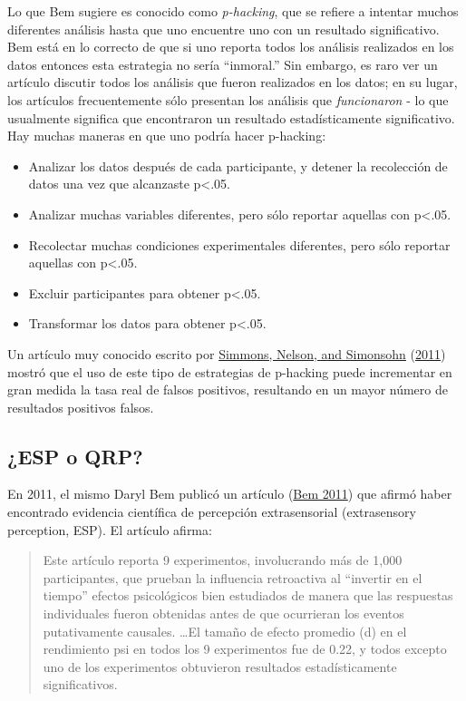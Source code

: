 \documentclass[
  12pt,
]{book}
\providecommand{\tightlist}{%
  \setlength{\itemsep}{0pt}\setlength{\parskip}{0pt}}
\begin{document}
Lo que Bem sugiere es conocido como \emph{p-hacking}, que se refiere a intentar muchos diferentes análisis hasta que uno encuentre uno con un resultado significativo. Bem está en lo correcto de que si uno reporta todos los análisis realizados en los datos entonces esta estrategia no sería ``inmoral.'' Sin embargo, es raro ver un artículo discutir todos los análisis que fueron realizados en los datos; en su lugar, los artículos frecuentemente sólo presentan los análisis que \emph{funcionaron} - lo que usualmente significa que encontraron un resultado estadísticamente significativo. Hay muchas maneras en que uno podría hacer p-hacking:

\begin{itemize}
\tightlist
\item
  Analizar los datos después de cada participante, y detener la recolección de datos una vez que alcanzaste p\textless.05.
\item
  Analizar muchas variables diferentes, pero sólo reportar aquellas con p\textless.05.
\item
  Recolectar muchas condiciones experimentales diferentes, pero sólo reportar aquellas con p\textless.05.
\item
  Excluir participantes para obtener p\textless.05.
\item
  Transformar los datos para obtener p\textless.05.
\end{itemize}

Un artículo muy conocido escrito por \protect\hyperlink{ref-simm:nels:simo:2011}{Simmons, Nelson, and Simonsohn} (\protect\hyperlink{ref-simm:nels:simo:2011}{2011}) mostró que el uso de este tipo de estrategias de p-hacking puede incrementar en gran medida la tasa real de falsos positivos, resultando en un mayor número de resultados positivos falsos.

\hypertarget{esp-o-qrp}{%
\subsection{¿ESP o QRP?}\label{esp-o-qrp}}

En 2011, el mismo Daryl Bem publicó un artículo (\protect\hyperlink{ref-bem:2011}{Bem 2011}) que afirmó haber encontrado evidencia científica de percepción extrasensorial (extrasensory perception, ESP). El artículo afirma:

\begin{quote}
Este artículo reporta 9 experimentos, involucrando más de 1,000 participantes, que prueban la influencia retroactiva al ``invertir en el tiempo'' efectos psicológicos bien estudiados de manera que las respuestas individuales fueron obtenidas antes de que ocurrieran los eventos putativamente causales. \ldots El tamaño de efecto promedio (d) en el rendimiento psi en todos los 9 experimentos fue de 0.22, y todos excepto uno de los experimentos obtuvieron resultados estadísticamente significativos.
\end{quote}
\end{document}
